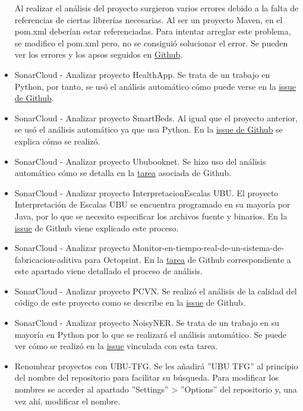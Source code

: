 \begin{itemize}
		Al realizar el análisis del proyecto surgieron varios errores debido a la falta de referencias de ciertas librerías necesarias. Al ser un proyecto Maven, en el pom.xml deberían estar referenciadas. Para intentar arreglar este problema, se modifico el pom.xml pero, no se consiguió solucionar el error. Se pueden ver los errores y los apsos seguidos en \href{https://github.com/dbo1001/Gestor-TFG-2021/issues/154}{Github}.
	\item SonarCloud - Analizar proyecto HealthApp.
		Se trata de un trabajo en Python, por tanto, se usó el análisis automático cómo puede verse en la \href{https://github.com/dbo1001/Gestor-TFG-2021/issues/153}{issue de Github}.
	\item SonarCloud - Analizar proyecto SmartBeds.
		Al igual que el proyecto anterior, se usó el análisis automático ya que usa Python. En la \href{https://github.com/dbo1001/Gestor-TFG-2021/issues/148}{issue de Github} se explica cómo se realizó.
	\item SonarCloud - Analizar proyecto Ububooknet.
		Se hizo uso del análisis automático cómo se detalla en la \href{https://github.com/dbo1001/Gestor-TFG-2021/issues/159}{tarea} asociada de Github.
	\item SonarCloud - Analizar proyecto InterpretacionEscalas UBU.
		El proyecto Interpretación de Escalas UBU se encuentra programado en su mayoría por Java, por lo que se necesito especificar los archivos fuente y binarios. En la \href{https://github.com/dbo1001/Gestor-TFG-2021/issues/163}{issue} de Github viene explicado este proceso.
	\item SonarCloud - Analizar proyecto Monitor-en-tiempo-real-de-un-sistema-de-fabricacion-aditiva para Octoprint.
		En la \href{https://github.com/dbo1001/Gestor-TFG-2021/issues/164}{tarea} de Github correspondiente a este apartado viene detallado el proceso de análisis.
	\item SonarCloud - Analizar proyecto PCVN.
		Se realizó el análisis de la calidad del código de este proyecto como se describe en la \href{https://github.com/dbo1001/Gestor-TFG-2021/issues/162}{issue} de Github.
	\item SonarCloud - Analizar proyecto NoisyNER. 
		Se trata de un trabajo en su mayoría en Python por lo que se realizará el análisis automático. Se puede ver cómo se realizó en la \href{https://github.com/dbo1001/Gestor-TFG-2021/issues/160}{issue} vinculada con esta tarea.
	\item Renombrar proyectos con UBU-TFG. 
		Se les añadirá ''UBU TFG'' al principio del nombre del repositorio para facilitar su búsqueda. Para modificar los nombres se acceder al apartado ''Settings'' > ''Options'' del repositorio y, una vez ahí, modificar el nombre.

\end{itemize}
